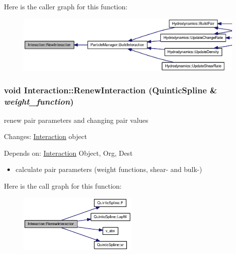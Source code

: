 Here is the caller graph for this function:\nopagebreak
\begin{figure}[H]
\begin{center}
\leavevmode
\includegraphics[width=420pt]{classInteraction_cba2f76f1316695e948c07d31dfadea9_icgraph}
\end{center}
\end{figure}
\hypertarget{classInteraction_1adb37756172d95124e56556c9008120}{
\subsubsection[{RenewInteraction}]{\setlength{\rightskip}{0pt plus 5cm}void Interaction::RenewInteraction ({\bf QuinticSpline} \& {\em weight\_\-function})}}
\label{classInteraction_1adb37756172d95124e56556c9008120}


renew pair parameters and changing pair values 

Changes: \hyperlink{classInteraction}{Interaction} object\par
 Depends on: \hyperlink{classInteraction}{Interaction} Object, Org, Dest 

\begin{itemize}
\item calculate pair parameters (weight functions, shear- and bulk-) \end{itemize}


Here is the call graph for this function:\nopagebreak
\begin{figure}[H]
\begin{center}
\leavevmode
\includegraphics[width=164pt]{classInteraction_1adb37756172d95124e56556c9008120_cgraph}
\end{center}
\end{figure}



